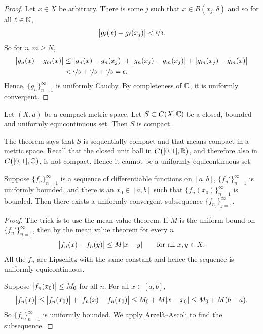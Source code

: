 \begin{proof}
Let $x \in X$ be arbitrary.  There is some $j$ such that
$x \in B(x_j,\delta)$ and so for all $\ell \in {\mathbb{N}}$,
\begin{equation*}
\bigl\lvert {g_\ell(x)-g_\ell(x_j)} \bigr\rvert < \nicefrac{\epsilon}{3}.
\end{equation*}
So for $n,m \geq N$,
\begin{equation*}
\begin{split}
\bigl\lvert {g_n(x)-g_m(x)} \bigr\rvert & \leq
\bigl\lvert {g_n(x)-g_n(x_j)} \bigr\rvert +
\bigl\lvert {g_n(x_j)-g_m(x_j)} \bigr\rvert +
\bigl\lvert {g_m(x_j)-g_m(x)} \bigr\rvert
\\
& <
\nicefrac{\epsilon}{3} +
\nicefrac{\epsilon}{3} +
\nicefrac{\epsilon}{3} = \epsilon .
\end{split}
\end{equation*}
Hence, $\{ g_n \}_{n=1}^\infty$ is uniformly Cauchy.  By completeness of ${\mathbb{C}}$,
it is uniformly convergent.
\end{proof}

\begin{cor}
Let $(X,d)$ be a compact metric space.
Let $S \subset C(X,{\mathbb{C}})$ be a closed, bounded and uniformly equicontinuous set.
Then $S$ is compact.
\end{cor}

The theorem says that $S$
is sequentially compact and that means
compact in a metric space.
Recall that the closed unit ball in $C\bigl([0,1],{\mathbb{R}}\bigr)$, and therefore also in
$C\bigl([0,1],{\mathbb{C}}\bigr)$, is not compact.
Hence it cannot be a uniformly equicontinuous set.

\begin{cor}
Suppose $\{ f_n \}_{n=1}^\infty$ is a sequence of differentiable functions on $[a,b]$,
$\{ f_n' \}_{n=1}^\infty$ is uniformly bounded, and there is an
$x_0 \in [a,b]$ such that $\{ f_n(x_0) \}_{n=1}^\infty$ is bounded.
Then there exists a uniformly convergent
subsequence $\{ f_{n_j} \}_{j=1}^\infty$.
\end{cor}

\begin{proof}
The trick is to use the mean value theorem.  If $M$ is the uniform bound on
$\{ f_n' \}_{n=1}^\infty$, then by the mean value theorem for every $n$
\begin{equation*}
\bigl\lvert {f_n(x)-f_n(y)} \bigr\rvert \leq M \lvert {x-y} \rvert \qquad \text{for all } x,y \in X.
\end{equation*}
All the $f_n$ are Lipschitz with the same constant and hence
the sequence is
uniformly equicontinuous.

Suppose $\bigl\lvert {f_n(x_0)} \bigr\rvert \leq M_0$ for all $n$.
For all $x \in [a,b]$,
\begin{equation*}
\bigl\lvert {f_n(x)} \bigr\rvert \leq \bigl\lvert {f_n(x_0)} \bigr\rvert+ \bigl\lvert {f_n(x)-f_n(x_0)} \bigr\rvert \leq M_0+ M \lvert {x-x_0} \rvert
\leq M_0 + M(b-a) .
\end{equation*}
So $\{ f_n \}_{n=1}^\infty$ is uniformly bounded.
We apply \hyperref[thm:arzelaascoli]{Arzel\`a--Ascoli} to find the subsequence.
\end{proof}

